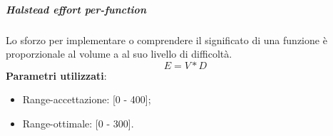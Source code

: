 			
			\subparagraph{Halstead effort per-function}
			Lo sforzo per implementare o comprendere il significato di una funzione è proporzionale al volume a al suo livello di difficoltà.
			 \[
			 E = V * D
			\]
			\textbf{Parametri utilizzati}:
			\begin{itemize}
				\item Range-accettazione: [0 - 400];
				\item Range-ottimale: [0 - 300].
			\end{itemize}

			

